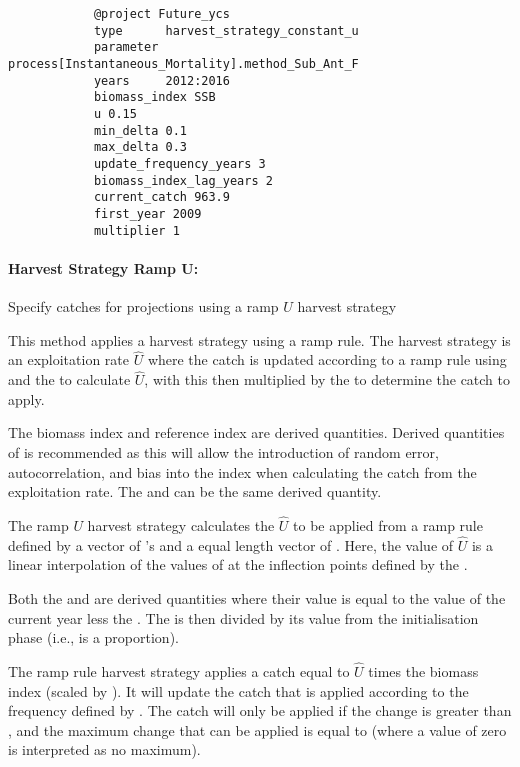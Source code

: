 {\small{\begin{verbatim}
			@project Future_ycs
			type      harvest_strategy_constant_u
			parameter process[Instantaneous_Mortality].method_Sub_Ant_F
			years     2012:2016
			biomass_index SSB
			u 0.15
			min_delta 0.1
			max_delta 0.3
			update_frequency_years 3
			biomass_index_lag_years 2
			current_catch 963.9
			first_year 2009
			multiplier 1
\end{verbatim}}}

\paragraph[HarvestStrategyRampU]{Harvest Strategy Ramp U:} Specify catches for projections using a ramp $U$ harvest strategy   \label{sec:Project-HarvestStrategyRampU} 

This method applies a harvest strategy using a ramp rule. The harvest strategy is an exploitation rate $\hat{U}$ where the catch is updated according to a ramp rule using  and the  to calculate $\hat{U}$, with this then multiplied by the  to determine the catch to apply.

The biomass index and reference index are derived quantities. Derived quantities of  is recommended as this will allow the introduction of random error, autocorrelation, and bias into the index when calculating the catch from the exploitation rate. The  and  can be the same derived quantity.

The ramp $U$ harvest strategy calculates the $\hat{U}$ to be applied from a ramp rule defined by a vector of 's and a equal length vector of . Here, the value of $\hat{U}$ is a linear interpolation of the values of  at the inflection points defined by the . 

Both the  and  are derived quantities where their value is equal to the value of the current year less the . The  is then divided by its value from the initialisation phase (i.e., is a proportion). 

The ramp rule harvest strategy applies a catch equal to $\hat{U}$ times the biomass index (scaled by ). It will update the catch that is applied according to the frequency defined by . The catch will only be applied if the change is greater than , and the maximum change that can be applied is equal to  (where a value of zero is interpreted as no maximum). 

